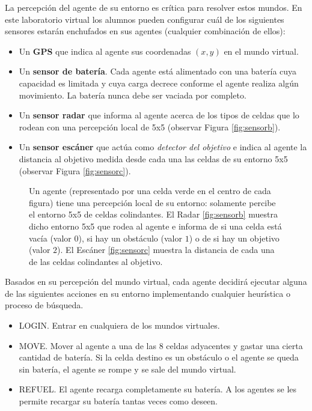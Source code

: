 La percepción del agente de su entorno es crítica para resolver estos mundos. En este laboratorio virtual los alumnos pueden configurar cuál de los siguientes sensores estarán enchufados en sus agentes (cualquier combinación de ellos):

\begin{itemize}
	\item Un \textbf{GPS} que indica al agente sus coordenadas $(x,y)$ en el mundo virtual.
	\item Un \textbf{sensor de batería}. Cada agente está alimentado con una batería cuya capacidad es limitada y cuya carga decrece conforme el agente realiza algún movimiento. La batería nunca debe ser vaciada por completo.
	\item Un \textbf{sensor radar} que informa al agente acerca de los tipos de celdas que lo rodean con una percepción local de 5x5 (observar Figura \ref{fig:sensorb}).
	\item Un \textbf{sensor escáner} que actúa como \emph{detector del objetivo} e indica al agente la distancia al objetivo medida desde cada una las celdas de su entorno 5x5 (observar Figura \ref{fig:sensorc}).
\end{itemize}

\begin{figure}[H]
\centering
{}\qquad
{}\qquad
{}%
\caption{Un agente (representado por una celda verde en el centro de cada figura) tiene una percepción local de su entorno: solamente percibe el entorno 5x5 de celdas colindantes. El Radar \ref{fig:sensorb} muestra dicho entorno 5x5 que rodea al agente e informa de si una celda está vacía (valor $0$), si hay un obstáculo (valor $1$) o de si hay un objetivo (valor $2$). El Escáner \ref{fig:sensorc} muestra la distancia de cada una de las celdas colindantes al objetivo.}
\label{fig:sensors}
\end{figure}

Basados en su percepción del mundo virtual, cada agente decidirá ejecutar alguna de las siguientes acciones en su entorno implementando cualquier heurística o proceso de búsqueda.

\begin{itemize}
	\item LOGIN. Entrar en cualquiera de los mundos virtuales.
	\item MOVE. Mover al agente a una de las $8$ celdas adyacentes y gastar una cierta cantidad de batería. Si la celda destino es un obstáculo o el agente se queda sin batería, el agente se rompe y se sale del mundo  virtual.
	\item REFUEL. El agente recarga completamente su batería. A los agentes se les permite recargar su batería tantas veces como deseen.
\end{itemize}